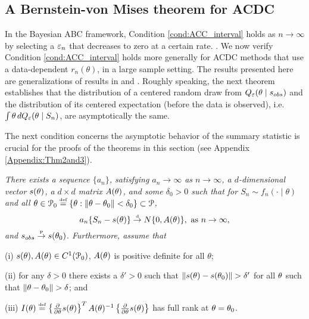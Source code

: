 \subsection{A Bernstein-von Mises theorem for ACDC}\label{sec:large_n_theory}
In the Bayesian ABC framework, Condition \ref{cond:ACC_interval} holds as $n\rightarrow\infty$ %
by selecting a $\varepsilon_n$ that decreases to zero at a certain rate.
\cite[]{Li2016}. We now verify Condition \ref{cond:ACC_interval} holds more generally for 
ACDC methods that use a  data-dependent $r_{n}(\theta)$, in a large sample setting. The results presented here are generalizations of results in 
\cite{Li2017} and \cite{Li2016}. %
Roughly speaking, the next theorem establishes that the distribution of a centered random draw from $Q_{\varepsilon}(\theta \mid s_{obs})$
and the distribution of its centered expectation (before the data is observed), i.e. $\int {}{\theta}  \, d Q_{\varepsilon}(\theta\mid S_n)$, are asymptotically the same. %


The next condition concerns the asymptotic behavior of the summary statistic is crucial for the proofs of the theorems in this section (see Appendix \ref{Appendix:Thm2and3}). 

\begin{condition} \label{sum_conv}
{\it There exists a sequence $\{a_{n}\}$, satisfying $a_{n}\rightarrow\infty$
		as $n\rightarrow\infty$, a $d$-dimensional vector $s({}{\theta})$, a $d\times d$ matrix $A({}{\theta})$, and some $\delta_0>0$ such that for $S_{n}\sim f_{n}(\cdot\mid\theta)$
		and all $\btheta\in\mathcal{P}_{0} %
\stackrel{\hbox{\tiny def}} =  \{ \btheta : \|\btheta-\btheta_{0}\| < \delta_0\} \subset \mathcal{P}$, 
		\[
		a_{n}\{{}{S}_{n}-s({}{\theta})\} \stackrel{\hbox{\tiny d}} \rightarrow N\{0,A({}{\theta})\},\mbox{ as \ensuremath{n\rightarrow\infty}},
		\]
and ${}{s}_{\relax obs} \stackrel{\hbox{\tiny P}} \rightarrow  s({}{\theta}_{0})$.
Furthermore, assume that 

\noindent (i) $s({}{\theta}), A({}{\theta})\in C^{1}(\mathcal{P}_{0})$, $A({}{\theta})$ is
		positive definite for all $\theta$; %

\noindent (ii) for any $\delta>0$ there
		exists a $\delta'>0$ such that $\|s(\btheta)-s(\btheta_{0})\|>\delta'$
		for all ${}{\theta}$ such that $\|\btheta-\btheta_{0}\|>\delta$; and
		
\noindent (iii) $I(\theta)  \stackrel{\hbox{\tiny def}} = \left\{ \frac{\partial}{\partial\theta}s(\theta)\right\} ^{T}A(\theta)^{-1}\left\{ \frac{\partial}{\partial\theta}s(\theta)\right\} $
has full rank at ${}{\theta}={}{\theta}_{0}$.}
\end{condition}

